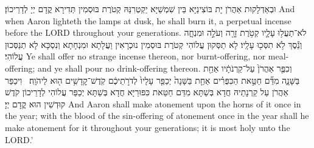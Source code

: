 {{וּבְאַדְלָקוּת אַהֲרֹן יָת בּוֹצִינַיָּא בֵּין שִׁמְשַׁיָּא יַקְטְרִנַּהּ קְטֹרֶת בּוּסְמִין תְּדִירָא קֳדָם יְיָ לְדָרֵיכוֹן׃}
{And when Aaron lighteth the lamps at dusk, he shall burn it, a perpetual incense before the LORD throughout your generations.}{}
{לֹא־תַעֲל֥וּ עָלָ֛יו קְטֹ֥רֶת זָרָ֖ה וְעֹלָ֣ה וּמִנְחָ֑ה וְנֵ֕סֶךְ לֹ֥א תִסְּכ֖וּ עָלָֽיו׃
}
{לָא תַסְּקוּן עֲלוֹהִי קְטֹרֶת בּוּסְמִין נוּכְרָאִין וַעֲלָתָא וּמִנְחָתָא וְנִסְכָּא לָא תְנַסְּכוּן עֲלוֹהִי׃}
{Ye shall offer no strange incense thereon, nor burnt-offering, nor meal-offering; and ye shall pour no drink-offering thereon.}{}
{וְכִפֶּ֤ר אַהֲרֹן֙ עַל־קַרְנֹתָ֔יו אַחַ֖ת בַּשָּׁנָ֑ה מִדַּ֞ם חַטַּ֣את הַכִּפֻּרִ֗ים אַחַ֤ת בַּשָּׁנָה֙ יְכַפֵּ֤ר עָלָיו֙ לְדֹרֹ֣תֵיכֶ֔ם קֹֽדֶשׁ־קׇדָשִׁ֥ים ה֖וּא לַיהֹוָֽה׃ \petucha 
{}}
{וִיכַפַּר אַהֲרֹן עַל קַרְנָתֵיהּ חֲדָא בְּשַׁתָּא מִדַּם חַטַּאת כִּפּוּרַיָּא חֲדָא בְּשַׁתָּא יְכַפַּר עֲלוֹהִי לְדָרֵיכוֹן קֹדֶשׁ קוּדְשִׁין הוּא קֳדָם יְיָ׃}
{And Aaron shall make atonement upon the horns of it once in the year; with the blood of the sin-offering of atonement once in the year shall he make atonement for it throughout your generations; it is most holy unto the LORD.’}{}
}
